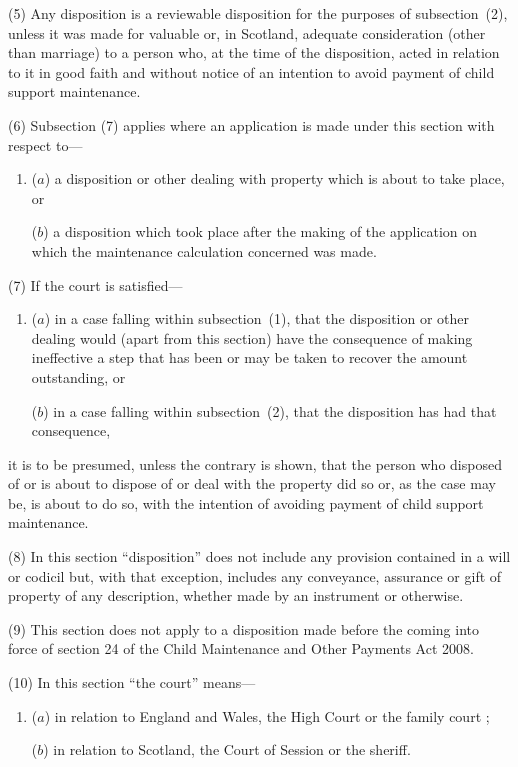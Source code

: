 \documentclass[12pt,a4paper]{article}
\begin{document}
(5)
Any disposition is a reviewable disposition for the purposes of subsection~(2), unless it was made for valuable or, in Scotland, adequate consideration (other than marriage) to a person who, at the time of the disposition, acted in relation to it in good faith and without notice of an intention to avoid payment of child support maintenance.

(6)
Subsection (7) applies where an application is made under this section with respect to---
\begin{enumerate}\item[]
($a$) a disposition or other dealing with property which is about to take place, or

($b$) a disposition which took place after the making of the application on which the maintenance calculation concerned was made.
\end{enumerate}

(7) If the court is satisfied---
\begin{enumerate}\item[]
($a$) in a case falling within subsection~(1), that the disposition or other dealing would (apart from this section) have the consequence of making ineffective a step that has been or may be taken to recover the amount outstanding, or

($b$) in a case falling within subsection~(2), that the disposition has had that consequence,
\end{enumerate}
it is to be presumed, unless the contrary is shown, that the person who disposed of or is about to dispose of or deal with the property did so or, as the case may be, is about to do so, with the intention of avoiding payment of child support maintenance.

(8)
In this section ``disposition'' does not include any provision contained in a will or codicil but, with that exception, includes any conveyance, assurance or gift of property of any description, whether made by an instrument or otherwise.

(9)
This section does not apply to a disposition made before the coming into force of section 24 of the Child Maintenance and Other Payments Act 2008.

(10)
In this section ``the court'' means---
\begin{enumerate}\item[]
($a$) in relation to England and Wales, the High Court
or the family court%
;

($b$) in relation to Scotland, the Court of Session or the sheriff.
\end{enumerate}
\end{document}
